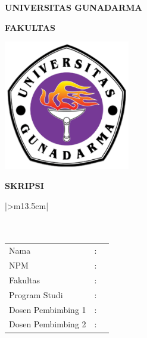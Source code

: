 \documentclass[12pt,oneside,bahasa]{book}
\providecommand{\tabularnewline}{\\}
\begin{document}
 
\sloppy 
\thispagestyle{empty}


\pagestyle{romanstyle}

\vspace*{10mm}

\begin{center}
{\large\textbf{UNIVERSITAS GUNADARMA}}{\large\par}
\par\end{center}

\begin{center}
{\large\textbf{FAKULTAS \MakeUppercase{\Fakultas}}}{\large\par}
\par\end{center}

\vspace*{10mm}

\begin{center}
\includegraphics[width=55mm]{images/gundarlogo.png}
\par\end{center}

\vspace*{3mm}

\begin{center}
{\Large\textbf{SKRIPSI}}{\Large\par}
\par\end{center}

\vspace*{7mm}

\begin{center}
\begin{tabular}{|>{\centering}m{13.5cm}|}
\hline 
\centering{}~~\tabularnewline
\centering{}\textbf{\MakeUppercase{\Judul}}\tabularnewline
~~\tabularnewline
\centering{}%
\begin{tabular}{lcl}
Nama & : & \Penulis\tabularnewline
NPM & : & \NPM\tabularnewline
Fakultas & : & \Fakultas\tabularnewline
Program Studi & : & \Jurusan\tabularnewline
Dosen Pembimbing 1 & : & \DosenPembimbingA\tabularnewline
Dosen Pembimbing 2 & : & \DosenPembimbingB\tabularnewline
\end{tabular}\tabularnewline
~~\tabularnewline
\hline 
\end{tabular}
\par\end{center}
\end{document}
